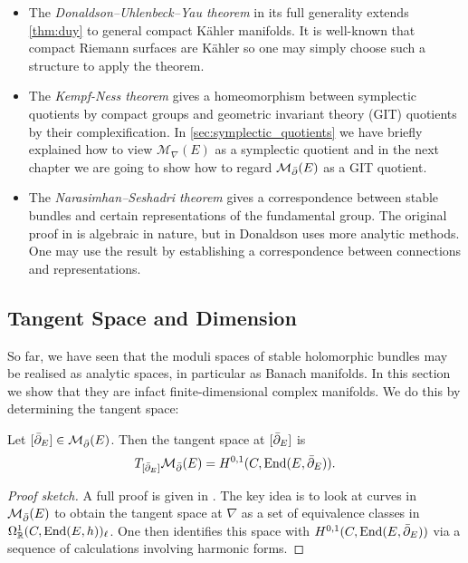 \documentclass[12pt]{ociamthesis}  %
\begin{document}
\begin{itemize}
  \item The \emph{Donaldson–Uhlenbeck–Yau theorem} \missingcitation
        in its full generality extends \ref{thm:duy} to general compact
        K\"ahler manifolds. It is well-known that compact Riemann surfaces
        are K\"ahler \missingcitation so one may simply choose such a structure to
        apply the theorem.
  \item The \emph{Kempf-Ness theorem} \missingcitation gives a homeomorphism between
        symplectic quotients by compact groups and geometric invariant
        theory (GIT) quotients by their complexification. In
        \ref{sec:symplectic_quotients} we have briefly
        explained how to view $\mathcal M_\nabla(E)$ as a symplectic quotient
        and in the next chapter we are going to show how to regard
        $\mathcal M_{\bar{\partial}}(E)$ as a GIT quotient.
  \item The \emph{Narasimhan–Seshadri theorem} \cite[Theorem 8.1]{ns1965} gives
        a correspondence between stable bundles and certain representations
        of the fundamental group. The original proof in \cite{ns1965}
        is algebraic in nature, but in \cite{donaldson1983} Donaldson
        uses more analytic methods. One may use the result by establishing
        a correspondence between connections and representations.
\end{itemize}

\subsection{Tangent Space and Dimension}

So far, we have seen that the moduli spaces of stable holomorphic
bundles may be realised as analytic spaces, in particular as
Banach manifolds. In this section we show that they are infact
finite-dimensional complex manifolds. We do this by determining
the tangent space:

\begin{theorem}
  Let $[{\bar{\partial}}_E]\in\mathcal M_{\bar{\partial}}(E)$. Then the tangent space at $[{\bar{\partial}}_E]$ is
  \begin{align*}
    T_{[{\bar{\partial}}_E]}\mathcal M_{\bar{\partial}}(E) = H^{0,1}(C,\operatorname{End}(E,{\bar{\partial}}_E)).
  \end{align*}
  \begin{proof}[Proof sketch]
    A full proof is given in \cite[223-225]{kobayashi1987}. The key idea is to look
    at curves in $\mathcal M_{\bar{\partial}}(E)$ to obtain the tangent space at $\nabla$ as a set of
    equivalence classes in $\Omega^1_{\mathbb{R}}(C,\operatorname{End}(E,h))_\ell$. One then
    identifies this space with $H^{0,1}(C,\operatorname{End}(E,{\bar{\partial}}_E))$ via a sequence of calculations
    involving harmonic forms.
  \end{proof}
\end{theorem}
\end{document}

